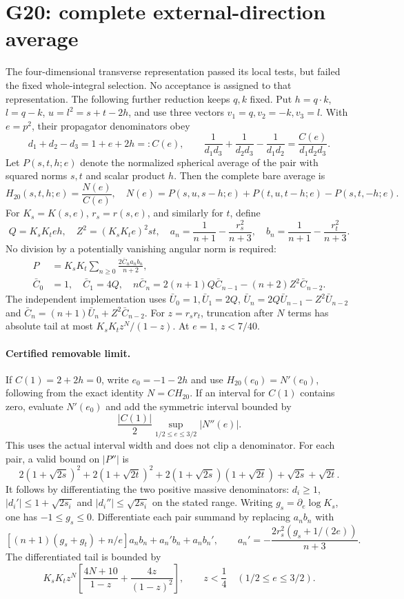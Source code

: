 \documentclass[11pt]{article}
\begin{document}
\section*{G20: complete external-direction average}
The four-dimensional transverse representation passed its local tests,
but failed the fixed whole-integral selection. No acceptance is assigned
to that representation. The following further reduction keeps $q,k$ fixed.
Put $h=q\cdot k$, $l=q-k$, $u=l^2=s+t-2h$, and use three vectors
$v_1=q,v_2=-k,v_3=l$. With $e=p^2$, their propagator denominators obey
\[
 d_1+d_2-d_3=1+e+2h=:C(e),\qquad
 \frac1{d_1d_3}+\frac1{d_2d_3}-\frac1{d_1d_2}
 =\frac{C(e)}{d_1d_2d_3}.
\]
Let $P(s,t,h;e)$ denote the normalized spherical average of the pair
with squared norms $s,t$ and scalar product $h$. Then the complete bare
average is
\[
 H_{20}(s,t,h;e)=\frac{N(e)}{C(e)},\quad
 N(e)=P(s,u,s-h;e)+P(t,u,t-h;e)-P(s,t,-h;e).
\]
For $K_s=K(s,e)$, $r_s=r(s,e)$, and similarly for $t$, define
\[
 Q=K_sK_t e h,\quad Z^2=(K_sK_t e)^2 st,\quad
 a_n=\frac1{n+1}-\frac{r_s^2}{n+3},\quad
 b_n=\frac1{n+1}-\frac{r_t^2}{n+3}.
\]
No division by a potentially vanishing angular norm is required:
\begin{align*}
 P&=K_sK_t\sum_{n\geq0}\frac{2\bar C_n a_nb_n}{n+2},\\
 \bar C_0&=1,\quad\bar C_1=4Q,\quad
 n\bar C_n=2(n+1)Q\bar C_{n-1}-(n+2)Z^2\bar C_{n-2}.
\end{align*}
The independent implementation uses
$\bar U_0=1,\bar U_1=2Q$,
$\bar U_n=2Q\bar U_{n-1}-Z^2\bar U_{n-2}$ and
$\bar C_n=(n+1)\bar U_n+Z^2\bar C_{n-2}$.
For $z=r_sr_t$, truncation after $N$ terms has absolute tail at most
$K_sK_t z^N/(1-z)$. At $e=1$, $z<7/40$.

\paragraph{Certified removable limit.}
If $C(1)=2+2h=0$, write $e_0=-1-2h$ and use
$H_{20}(e_0)=N'(e_0)$, following from the exact identity $N=C H_{20}$.
If an interval for $C(1)$ contains zero, evaluate $N'(e_0)$ and add
the symmetric interval bounded by
\[
 \frac{|C(1)|}{2}\sup_{1/2\leq e\leq3/2}|N''(e)|.
\]
This uses the actual interval width and does not clip a denominator.
For each pair, a valid bound on $|P''|$ is
\[
 2(1+\sqrt{2s})^2+2(1+\sqrt{2t})^2
 +2(1+\sqrt{2s})(1+\sqrt{2t})+\sqrt{2s}+\sqrt{2t}.
\]
It follows by differentiating the two positive massive denominators:
$d_i\geq1$, $|d_i'|\leq1+\sqrt{2s_i}$ and
$|d_i''|\leq\sqrt{2s_i}$ on the stated range.
Writing $g_s=\partial_e\log K_s$, one has $-1\leq g_s\leq0$.
Differentiate each pair summand by replacing $a_nb_n$ with
\[
 [(n+1)(g_s+g_t)+n/e]a_nb_n+a_n'b_n+a_nb_n',\qquad
 a_n'=-\frac{2r_s^2(g_s+1/(2e))}{n+3}.
\]
The differentiated tail is bounded by
\[
 K_sK_t z^N\left[\frac{4N+10}{1-z}+\frac{4z}{(1-z)^2}\right],
 \qquad z<\frac14\quad(1/2\leq e\leq3/2).
\]
\end{document}
